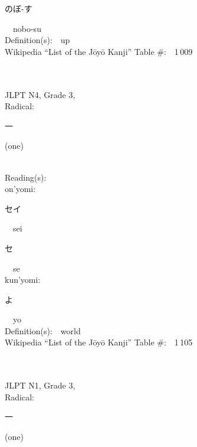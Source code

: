 \begin{multicols}{2}
{\hspace*{2em}}{\begin{CJK}{UTF8}{min} のぼ-す \end{CJK}}\ \ nobo-su\ \ \\
Definition(s):\ \ up \\
Wikipedia ``List of the J\=oy\=o Kanji'' Table \#:\ \ 1\,009 \\
\ \ \\
{\fontsize{34pt}{40pt}  }\ \ \\  %
{JLPT N4, Grade 3, \\Radical:\ \ {\begin{CJK}{UTF8}{min} 一 \end{CJK}} (one) } \\
Reading(s):\ \ \\
{\hspace*{1em}}on'yomi:\ \ \\
{\hspace*{2em}}{\begin{CJK}{UTF8}{min} セイ \end{CJK}}\ \ sei\ \ \\
{\hspace*{2em}}{\begin{CJK}{UTF8}{min} セ \end{CJK}}\ \ se\ \ \\
{\hspace*{1em}}kun'yomi:\ \ \\
{\hspace*{2em}}{\begin{CJK}{UTF8}{min} よ \end{CJK}}\ \ yo\ \ \\
Definition(s):\ \ world \\
Wikipedia ``List of the J\=oy\=o Kanji'' Table \#:\ \ 1\,105 \\
\ \ \\
{\fontsize{34pt}{40pt}  }\ \ \\  %
{JLPT N1, Grade 3, \\Radical:\ \ {\begin{CJK}{UTF8}{min} 一 \end{CJK}} (one) } \\

\end{multicols}

